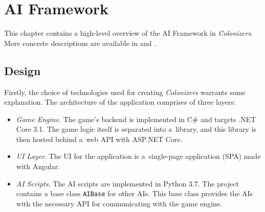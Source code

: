 \chapter{AI Framework}

This chapter contains a high-level overview of the AI Framework in \emph{Colonizers}.
More concrete descriptions are available in  and .

\section{Design}

Firstly, the choice of technologies used for creating \emph{Colonizers}
warrants some explanation. The architecture of the application comprises of three layers:
\begin{itemize}
    \item \emph{Game Engine}. The game's backend is implemented in C\# and targets
        .NET Core 3.1. The game logic itself is separated into a~library,
        and this library is then hosted behind a~web API with ASP.NET Core.
    \item \emph{UI Layer}. The UI for the application is a~single-page application
        (SPA) made with Angular.
    \item \emph{AI Scripts}. The AI scripts are implemented in Python 3.7. The project
        contains a base class \texttt{AIBase} for other AIs. This base class provides
        the AIs with the necessary API for communicating with the game engine.
\end{itemize}

